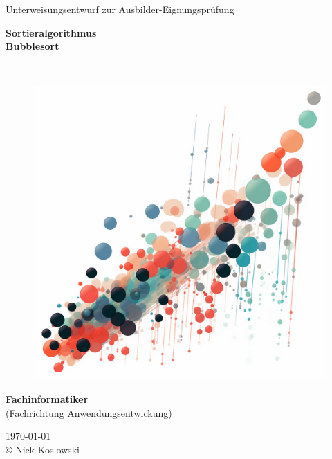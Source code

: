 \begin{titlepage}
\center
Unterweisungsentwurf zur Ausbilder-Eignungsprüfung\\[1.5cm]



\parbox{0.85\textwidth}{
\begin{center}
{\huge \bfseries Sortieralgorithmus \\[0.5cm] Bubblesort }
\end{center}
}
\\[1cm]


\begin{figure}[H]
\centering
\includegraphics[scale=0.25]{bubblesort}
\end{figure}

{\bfseries Fachinformatiker \\}
(Fachrichtung Anwendungsentwickung)

\vfill
\today \\[0.5cm]
\copyright \xspace Nick Koslowski


\end{titlepage}